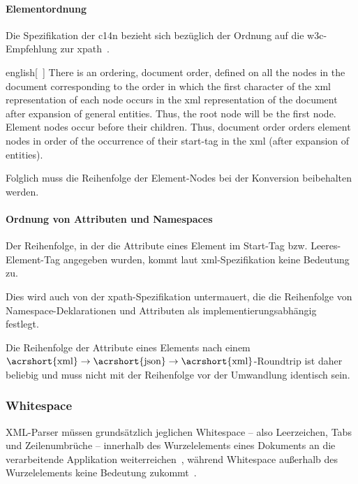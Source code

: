\paragraph{Elementordnung}

Die Spezifikation der \acrshort{c14n} bezieht sich bezüglich der Ordnung auf die \acrshort{w3c}-Empfehlung zur \acrfull{xpath}~\cite[Abschnitt~2.2]{boyer2001c14n}.

\begin{foreigndisplayquote}{english}[{~\cite[Abschnitt~5]{clark1999xpath1}}]
    There is an ordering, document order, defined on all the nodes in the document corresponding to the order in which the first character of the \acrshort{xml} representation of each node occurs in the \acrshort{xml} representation of the document after expansion of general entities. Thus, the root node will be the first node. Element nodes occur before their children. Thus, document order orders element nodes in order of the occurrence of their start-tag in the \acrshort{xml} (after expansion of entities).
\end{foreigndisplayquote}

Folglich muss die Reihenfolge der Element-Nodes bei der Konversion beibehalten werden.

\paragraph{Ordnung von Attributen und Namespaces}

Der Reihenfolge, in der die Attribute eines Element im Start-Tag bzw. Leeres-Element-Tag angegeben wurden, kommt laut \acrshort{xml}-Spezi\-fikation keine Bedeutung zu.~\cite[Abschnitt~3.1]{maler2008xml}

Dies wird auch von der \acrshort{xpath}-Spezifikation untermauert, die die Reihenfolge von Name\-space-Deklarationen und Attributen als implementierungsabhängig festlegt.~\cite[Abschnitt~5]{clark1999xpath1}

Die Reihenfolge der Attribute eines Elements nach einem $\text{\acrshort{xml}}\rightarrow{}\text{\acrshort{json}}\rightarrow{}\text{\acrshort{xml}}$-Roundtrip ist daher beliebig und muss nicht mit der Reihenfolge vor der Umwandlung identisch sein.

\subsubsection{Whitespace}

XML-Parser müssen grundsätzlich jeglichen Whitespace -- also Leerzeichen, Tabs und Zeilenumbrüche --  innerhalb des Wurzelelements eines Dokuments an die verarbeitende Applikation weiterreichen~\cite[Abschn.~2.10]{maler2008xml}, während Whitespace außerhalb des Wurzelelements keine Bedeutung zukommt~\cite[Abschnitt~2.1]{boyer2001c14n}.

